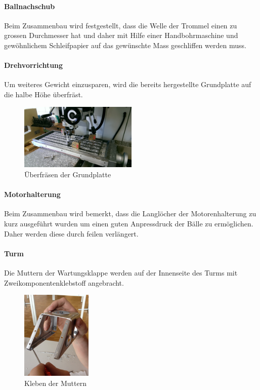 \paragraph{Ballnachschub}
Beim Zusammenbau wird festgestellt, dass die Welle der Trommel einen zu 
grossen Durchmesser hat und daher mit Hilfe einer Handbohrmaschine und 
gewöhnlichem Schleifpapier auf das gewünschte Mass geschliffen werden muss.

\paragraph{Drehvorrichtung}
Um weiteres Gewicht einzusparen, wird die bereits hergestellte Grundplatte auf 
die halbe Höhe überfräst.

\begin{figure}[h!]
	\centering
	\includegraphics[width=0.5\textwidth]{fig/IMAG0357.jpg}
	\caption{Überfräsen der Grundplatte}
	\label{fig:Grundplatte fräsen}
\end{figure}
\FloatBarrier

\paragraph{Motorhalterung}
Beim Zusammenbau wird bemerkt, dass die Langlöcher der Motorenhalterung zu 
kurz ausgeführt wurden um einen guten Anpressdruck der Bälle zu ermöglichen. 
Daher werden diese durch feilen verlängert.

\paragraph{Turm}
Die Muttern der Wartungsklappe werden auf der Innenseite des Turms mit 
Zweikomponentenklebstoff angebracht. 

\begin{figure}[h!]
	\centering
	\includegraphics[width=0.3\textwidth, trim=0 100 0 100, clip=true]{fig/IMG_2292.JPG}
	\caption{Kleben der Muttern}
	\label{fig:Muttern Kleben}
\end{figure}
\FloatBarrier

